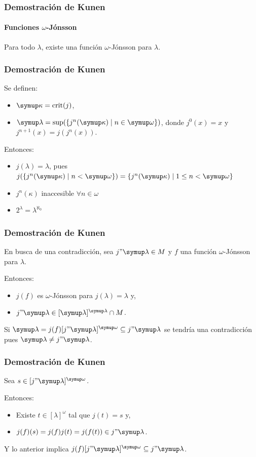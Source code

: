 \documentclass{beamer}
\begin{document}
\begin{frame}
    \frametitle{Demostración de Kunen}
    \framesubtitle{Funciones $\omega$-Jónsson}

    \begin{teo}
        Para todo $\lambda$, existe una función
        $\omega$-Jónsson para $\lambda$.
    \end{teo}
\end{frame}

\begin{frame}
    \frametitle{Demostración de Kunen}

    Se definen:
    \begin{itemize}
        \item $\kappa=\crit{j}$,
        \item $\lambda=\sup(\set{j^n(\kappa)\mid n\in\omega})$, donde
            $j^0(x)=x$ y $j^{n+1}(x) = j(j^{n}(x))$.
    \end{itemize}

    \pause
    Entonces:
    \begin{itemize}
        \item $j(\lambda) = \lambda$, pues
            $j(\set{j^n(\kappa)\mid n<\omega})
                = \set{j^n(\kappa)\mid 1\leq n<\omega}$
        \item $j^n(\kappa)$ inaccesible $\forall n\in\omega$
        \item $2^\lambda=\lambda^{\aleph_0}$
    \end{itemize}
\end{frame}

\begin{frame}
    \frametitle{Demostración de Kunen}

    En busca de una contradicción, sea $j"\lambda\in M$ y
    $f$ una función $\omega$-Jónsson para $\lambda$.

    \pause
    Entonces:
    \begin{itemize}
        \item $j(f)$ es $\omega$-Jónsson para $j(\lambda)=\lambda$ y,
        \item $j"\lambda\in[\lambda]^\lambda\cap M$.
    \end{itemize}

    \pause
    Si $\lambda = j(f)[j"\lambda]^\omega \subseteq j"\lambda$
    se tendría una contradicción pues $\lambda\neq j"\lambda$.
\end{frame}

\begin{frame}
    \frametitle{Demostración de Kunen}

    Sea $s\in [j"\lambda]^\omega$.

    \pause
    Entonces:
    \begin{itemize}
        \item Existe $t\in [\lambda]^\omega$ tal que $j(t) = s$ y,
        \item $j(f)(s) = j(f)j(t) = j(f(t)) \in j"\lambda$.
    \end{itemize}

    \pause
    Y lo anterior implica $j(f)[j"\lambda]^\omega \subseteq j"\lambda$.
\end{frame}
\end{document}
